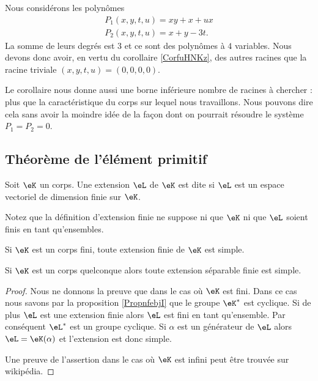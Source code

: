 \begin{example}
    Nous considérons les polynômes
    \begin{subequations}
        \begin{align}
            P_1(x,y,t,u)=xy+x+ux\\
            P_2(x,y,t,u)=x+y-3t.
        \end{align}
    \end{subequations}
    La somme de leurs degrés est \( 3\) et ce sont des polynômes à \( 4\) variables. Nous devons donc avoir, en vertu du corollaire \ref{CorfuHNKz}, des autres racines que la racine triviale \( (x,y,t,u)=(0,0,0,0)\).

    Le corollaire nous donne aussi une borne inférieure nombre de racines à chercher : plus que la caractéristique du corps sur lequel nous travaillons. Nous pouvons dire cela sans avoir la moindre idée de la façon dont on pourrait résoudre le système \( P_1=P_2=0\).
\end{example}

\subsection{Théorème de l'élément primitif}

\begin{definition}
    Soit \( \eK\) un corps. Une extension \( \eL\) de \( \eK\) est dite  si \( \eL\) est un espace vectoriel de dimension finie sur \( \eK\).
\end{definition}
Notez que la définition d'extension finie ne suppose ni que \( \eK\) ni que \( \eL\) soient finis en tant qu'ensembles.

\begin{theorem}
    Si \( \eK\) est un corps fini, toute extension finie de \( \eK\) est simple.

    Si \( \eK\) est un corps quelconque alors toute extension séparable finie est simple.
\end{theorem}

\begin{proof}
    Nous ne donnons la preuve que dans le cas où \( \eK\) est fini. Dans ce cas nous savons par la proposition \ref{PropnfebjI} que le groupe \( \eK^*\) est cyclique. Si de plus \( \eL\) est une extension finie alors \( \eL\) est fini en tant qu'ensemble. Par conséquent \( \eL^*\) est un groupe cyclique. Si \( \alpha\) est un générateur de \( \eL\) alors \( \eL=\eK(\alpha)\) et l'extension est donc simple.

    Une preuve de l'assertion dans le cas où \( \eK\) est infini peut être trouvée sur wikipédia.
\end{proof}

